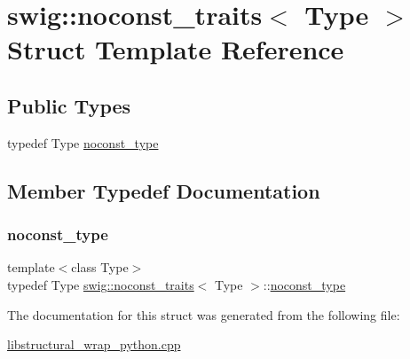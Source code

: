 \hypertarget{structswig_1_1noconst__traits}{}\section{swig\+:\+:noconst\+\_\+traits$<$ Type $>$ Struct Template Reference}
\label{structswig_1_1noconst__traits}
\subsection*{Public Types}
\begin{DoxyCompactItemize}
\item 
typedef Type \hyperlink{structswig_1_1noconst__traits_a372428d7bd7dc7ea86f03714159d6354}{noconst\+\_\+type}
\end{DoxyCompactItemize}


\subsection{Member Typedef Documentation}
\mbox{\label{structswig_1_1noconst__traits_a372428d7bd7dc7ea86f03714159d6354}} 
\subsubsection{\texorpdfstring{noconst\+\_\+type}{noconst\_type}}
{\footnotesize\ttfamily template$<$class Type$>$ \\
typedef Type \hyperlink{structswig_1_1noconst__traits}{swig\+::noconst\+\_\+traits}$<$ Type $>$\+::\hyperlink{structswig_1_1noconst__traits_a372428d7bd7dc7ea86f03714159d6354}{noconst\+\_\+type}}



The documentation for this struct was generated from the following file\+:\begin{DoxyCompactItemize}
\item 
\hyperlink{libstructural__wrap__python_8cpp}{libstructural\+\_\+wrap\+\_\+python.\+cpp}\end{DoxyCompactItemize}
